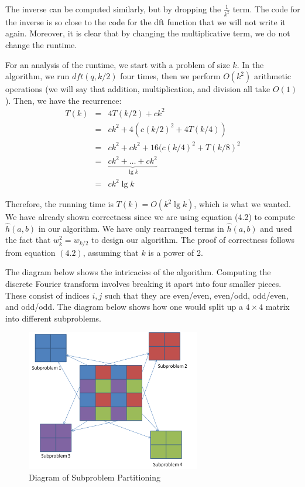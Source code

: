\documentclass[psamsfonts]{amsart}
\newenvironment{sol}{{\bfseries Solution}}{\qedsymbol}
\theoremstyle{definition}
\theoremstyle{remark}
\numberwithin{equation}{section}
\begin{document}
\begin{sol}
The inverse can be computed similarly, but by dropping the $\frac{1}{k^2}$ term. The code for the inverse is so close to the code for the dft function that we will not write it again. Moreover, it is clear that by changing the multiplicative term, we do not change the runtime. 

For an analysis of the runtime, we start with a problem of size $k$. In the algorithm, we run $dft(q, k/2)$ four times, then we perform $O(k^2)$ arithmetic operations (we will say that addition, multiplication, and division all take $O(1)$). Then, we have the recurrence:
\begin{eqnarray}
T(k) &=& 4T(k/2) + ck^2 \\
&=& ck^2 + 4(c(k/2)^2 + 4T(k/4)) \\
&=& ck^2 + ck^2 + 16(c(k/4)^2 + T(k/8)^2 \\
&=& \underbrace{ck^2 + \ldots + ck^2}_{\lg k} \\
&=& c k^2 \lg k
\end{eqnarray}

Therefore, the running time is $T(k) = O(k^2 \lg k)$, which is what we wanted. We have already shown correctness since we are using equation (4.2) to compute $\widehat{h}(a,b)$ in our algorithm. We have only rearranged terms in $\widehat{h}(a,b)$ and used the fact that $w_k^2 = w_{k/2}$ to design our algorithm. The proof of correctness follows from equation $(4.2)$, assuming that $k$ is a power of 2. 

The diagram below shows the intricacies of the algorithm. Computing the discrete Fourier transform involves breaking it apart into four smaller pieces. These consist of indices $i,j$ such that they are even/even, even/odd, odd/even, and odd/odd. The diagram below shows how one would split up a $4 \times 4$ matrix into different subproblems. 

\begin{figure}[h!]
\centering
\includegraphics[width=3in]{diagram.png}
\caption{Diagram of Subproblem Partitioning}
\end{figure}
\end{sol}
\end{document}
